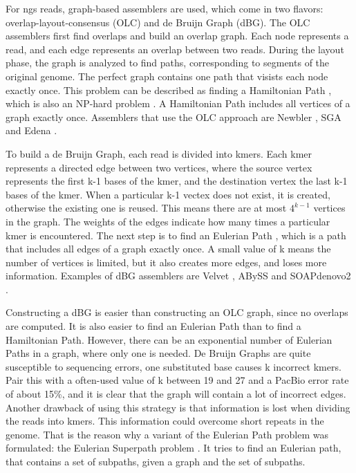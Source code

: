 \documentclass[../main/thesis.tex]{subfiles}
\begin{document}
For ngs reads, graph-based assemblers are used, which come in two flavors: overlap-layout-consensus (OLC) and de Bruijn Graph (dBG).
The OLC assemblers first find overlaps and build an overlap graph.
Each node represents a read, and each edge represents an overlap between two reads.
During the layout phase, the graph is analyzed to find paths, corresponding to segments of the original genome.
The perfect graph contains one path that visists each node exactly once.
This problem can be described as finding a Hamiltonian Path \cite{Euler_Hamil_paths}, which is also an NP-hard problem \cite{ngs_difficulties}.
A Hamiltonian Path includes all vertices of a graph exactly once.
Assemblers that use the OLC approach are Newbler \cite{newbler}, SGA \cite{sga} and Edena \cite{edena}.


To build a de Bruijn Graph, each read is divided into kmers.
Each kmer represents a directed edge between two vertices, where the source vertex represents the first k-1 bases of the kmer, and the destination vertex the last k-1 bases of the kmer.
When a particular k-1 vectex does not exist, it is created, otherwise the existing one is reused.
This means there are at most $4^{k-1}$ vertices in the graph.
The weights of the edges indicate how many times a particular kmer is encountered.
The next step is to find an Eulerian Path \cite{Euler_Hamil_paths}, which is a path that includes all edges of a graph exactly once.
A small value of k means the number of vertices is limited, but it also creates more edges, and loses more information.
Examples of dBG assemblers are Velvet \cite{velvet}, ABySS \cite{abyss} and SOAPdenovo2 \cite{soapdenovo2}.

Constructing a dBG is easier than constructing an OLC graph, since no overlaps are computed.
It is also easier to find an Eulerian Path than to find a Hamiltonian Path.
However, there can be an exponential number of Eulerian Paths in a graph, where only one is needed.
De Bruijn Graphs are quite susceptible to sequencing errors, one substituted base causes k incorrect kmers.
Pair this with a often-used value of k between 19 and 27 and a PacBio error rate of about 15\%, and it is clear that the graph will contain a lot of incorrect edges.
Another drawback of using this strategy is that information is lost when dividing the reads into kmers.
This information could overcome short repeats in the genome.
That is the reason why a variant of the Eulerian Path problem was formulated: the Eulerian Superpath problem \cite{Eulerian_Superpath}.
It tries to find an Eulerian path, that contains a set of subpaths, given a graph and the set of subpaths.
\end{document}
